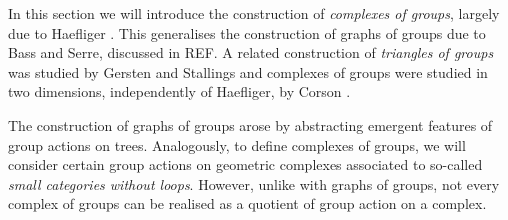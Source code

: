 In this section we will introduce the construction of \emph{complexes of groups}, largely due to Haefliger \cite{haefliger_complexes_1991a}.
This generalises the construction of graphs of groups due to Bass and Serre, discussed in REF.
A related construction of \emph{triangles of groups} was studied by Gersten and Stallings \cite{stallings_nonpositively_1991} and complexes of groups were studied in two dimensions, independently of Haefliger, by Corson \cite{corson_complexes_1992}.

The construction of graphs of groups arose by abstracting emergent features of group actions on trees.
Analogously, to define complexes of groups, we will consider certain group actions on geometric complexes associated to so-called \emph{small categories without loops}.
However, unlike with graphs of groups, not every complex of groups can be realised as a quotient of group action on a complex.

